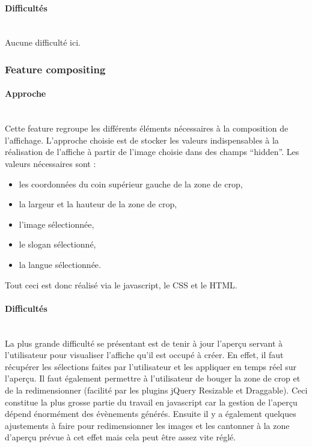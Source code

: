 \documentclass{article}
\begin{document}
\begin{sffamily}
\paragraph{Difficultés}$ $\\

Aucune difficulté ici.

\newpage

\subsubsection{Feature compositing}

\paragraph{Approche}$ $\\

Cette feature regroupe les différents éléments nécessaires à la composition de l'affichage. L'approche choisie est de stocker les valeurs indispensables à la réalisation de 
l'affiche à partir de l'image choisie dans des champs ``hidden''. Les valeurs nécessaires sont :
\begin{itemize}
\item les coordonnées du coin supérieur gauche de la zone de crop,
\item la largeur et la hauteur de la zone de crop,
\item l'image sélectionnée,
\item le slogan sélectionné,
\item la langue sélectionnée.
\end{itemize}

Tout ceci est donc réalisé via le javascript, le CSS et le HTML.


\paragraph{Difficultés}$ $\\

La plus grande difficulté se présentant est de tenir à jour l'aperçu servant à l'utilisateur pour visualiser l'affiche qu'il est occupé à créer. En effet, il faut 
récupérer les sélections faites par l'utilisateur et les appliquer en temps réel sur l'aperçu. Il faut également permettre à l'utilisateur de bouger la zone de crop et de la 
redimensionner (facilité par les plugins jQuery Resizable et Draggable). Ceci constitue la plus grosse partie du travail en javascript car la gestion de l'aperçu dépend 
énormément des évènements générés. Ensuite il y a également quelques ajustements à faire pour redimensionner les images et les cantonner à la zone d'aperçu prévue à cet 
effet mais cela peut être assez vite réglé.


\end{sffamily}
\end{document}
